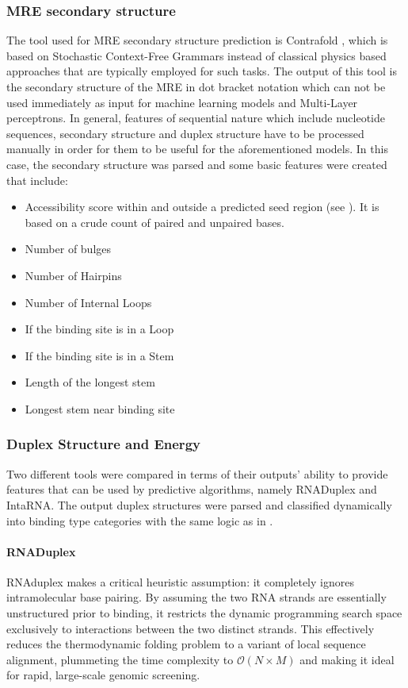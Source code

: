 \documentclass[en,ack]{dimscthesis}
\begin{document}
\subsubsection*{MRE secondary structure}
The tool used for MRE secondary structure prediction is Contrafold \parencite{doCONTRAfoldRNASecondary}, which is based on Stochastic Context-Free Grammars instead of classical physics based approaches that are typically employed for such tasks. The output of this tool is the secondary structure of the MRE in dot bracket notation which can not be used immediately as input for machine learning models and Multi-Layer perceptrons. In general, features of sequential nature which include nucleotide sequences, secondary structure and duplex structure have to be processed manually in order for them to be useful for the aforementioned models. In this case, the secondary structure was parsed and some basic features were created that include: 

\begin{itemize}
	\item Accessibility score within and outside a predicted seed region (see ). It is based on a crude count of paired and unpaired bases.
	\item Number of bulges 
	\item Number of Hairpins
	\item Number of Internal Loops
	\item If the binding site is in a Loop
	\item If the binding site is in a Stem
	\item Length of the longest stem
	\item Longest stem near binding site
\end{itemize}

\subsubsection*{Duplex Structure and Energy}
\label{subsec:Duplex Structure}
Two different tools were compared in terms of their outputs' ability to provide features that can be used by predictive algorithms, namely RNADuplex and IntaRNA. The output duplex structures were parsed and classified dynamically into binding type categories with the same logic as in \cite{zacharopoulouMicroTCNNAvantgardeDeep2024}.
\newpage

\paragraph{RNADuplex}
RNAduplex makes a critical heuristic assumption: it completely ignores intramolecular base pairing. By assuming the two RNA strands are essentially unstructured prior to binding, it restricts the dynamic programming search space exclusively to interactions between the two distinct strands. This effectively reduces the thermodynamic folding problem to a variant of local sequence alignment, plummeting the time complexity to $\mathcal{O}(N \times M)$ and making it ideal for rapid, large-scale genomic screening.
\end{document}
